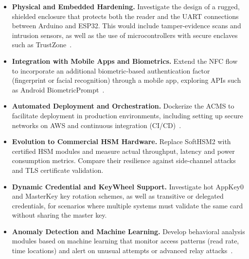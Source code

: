 \begin{itemize}
	\item \textbf{Physical and Embedded Hardening.} Investigate the design of a rugged, shielded enclosure that protects both the reader and the UART connections between Arduino and ESP32. This would include tamper-evidence scans and intrusion sensors, as well as the use of microcontrollers with secure enclaves such as TrustZone~\cite{Ref56}.
	
	\item \textbf{Integration with Mobile Apps and Biometrics.} Extend the NFC flow to incorporate an additional biometric-based authentication factor (fingerprint or facial recognition) through a mobile app, exploring APIs such as Android BiometricPrompt~\cite{Ref57}.
	
	\item \textbf{Automated Deployment and Orchestration.} Dockerize the ACMS to facilitate deployment in production environments, including setting up secure networks on AWS and continuous integration (CI/CD)~\cite{Ref58}.
	
	\item \textbf{Evolution to Commercial HSM Hardware.} Replace SoftHSM2 with certified HSM modules and measure actual throughput, latency and power consumption metrics. Compare their resilience against side-channel attacks and TLS certificate validation.
	
	\item \textbf{Dynamic Credential and KeyWheel Support.} Investigate hot AppKey0 and MasterKey key rotation schemes, as well as transitive or delegated credentials, for scenarios where multiple systems must validate the same card without sharing the master key.
	
	\item \textbf{Anomaly Detection and Machine Learning.} Develop behavioral analysis modules based on machine learning that monitor access patterns (read rate, time locations) and alert on unusual attempts or advanced relay attacks~\cite{Ref59}.
\end{itemize}